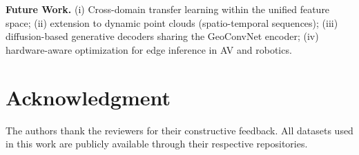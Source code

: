 \documentclass[10pt,conference]{IEEEtran}
\begin{document}
\noindent\textbf{Future Work.}
(i) Cross-domain transfer learning within the unified feature space;
(ii) extension to dynamic point clouds (spatio-temporal sequences);
(iii) diffusion-based generative decoders sharing the GeoConvNet encoder;
(iv) hardware-aware optimization for edge inference in AV and robotics.

\section*{Acknowledgment}

The authors thank the reviewers for their constructive feedback. All
datasets used in this work are publicly available through their respective
repositories.



\end{document}
